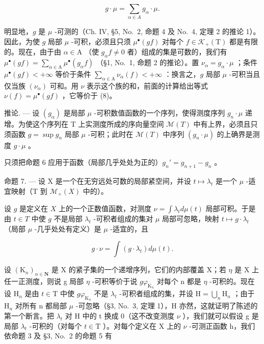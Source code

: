 \[
g \cdot \mu = \sum_ {\alpha \in A} g _ {\alpha} \cdot \mu .\tag{8}
\]

明显地，\(g\) 是 \(\mu\) -可测的（Ch. IV, §5, No.~2, 命题 4 及 No.~4, 定理 2 的推论 1）。因此，为使 \(g\) 局部 \(\mu\) -可积，必须且只须 \(\mu^{\bullet}(gf)\) 对每个 \(f \in \mathcal{K}_{+}(\mathrm{T})\) 都是有限的。现在，由于由 \(\alpha \in \mathrm{A}\) （使 \(g_{\alpha}f \neq 0\) 者）组成的集是可数的，我们有 \(\mu^{\bullet}(gf) = \sum_{\alpha \in \mathrm{A}} \mu^{\bullet}(g_{\alpha}f)\) （§1, No.~1, 命题 2 的推论）。置 \(\nu_{\alpha} = g_{\alpha} \cdot \mu\) ；条件 \(\mu^{\bullet}(gf) < +\infty\) 等价于条件 \(\sum_{\alpha \in \mathrm{A}} \nu_{\alpha}(f) < +\infty\) ：换言之，\(g\) 局部 \(\mu\) -可积当且仅当族 \((\nu_{\alpha})\) 可和。用 \(\nu\) 表示这个族的和，前面的计算给出等式 \(\nu(f) = \mu^{\bullet}(gf)\) ，它等价于 (8)。

推论. --- 设 \((g_{\alpha})\) 是局部 \(\mu\) -可积数值函数的一个序列，使得测度序列 \(g_{n} \cdot \mu\) 递增。为使这个序列在 T 上实测度所成的序向量空间 \(\mathcal{M}(T)\) 中有上界，必须且只须函数 \(g = \sup g_{n}\) 局部 \(\mu\) -可积；此时在 \(\mathcal{M}(T)\) 中序列 \((g_{n} \cdot \mu)\) 的上确界是测度 \(g \cdot \mu\) 。

只须把命题 6 应用于函数（局部几乎处处为正的）\(g_n' = g_{n+1} - g_n\) 。

命题 7. --- 设 X 是一个在无穷远处可数的局部紧空间，并设 \(t \mapsto \lambda_t\) 是一个 \(\mu\) -适宜映射（T 到 \(\mathcal{M}_+(X)\) 中的）。

设 \(g\) 是定义在 \(X\) 上的一个正数值函数，对测度 \(\nu = \int \lambda_t d\mu(t)\) 局部可积。于是由 \(t \in T\) 中使 \(g\) 不是局部 \(\lambda_t\) -可积者组成的集对 \(\mu\) 局部可忽略，映射 \(t \mapsto g \cdot \lambda_t\) （局部 \(\mu\) -几乎处处有定义）是 \(\mu\) -适宜的，且

\[
g \cdot \nu = \int (g \cdot \lambda_ {t}) d \mu (t).\tag{9}
\]

设 \((\mathrm{K}_{n})_{n\in\mathbf{N}}\) 是 X 的紧子集的一个递增序列，它们的内部覆盖 X；若 \(\eta\) 是 X 上任一正测度，则说 g 局部 \(\eta\) -可积等价于说 \(g\varphi_{\mathrm{K}_{n}}\) 对每个 n 都是 \(\eta\) -可积的。现在设 \(\mathrm{H}_{n}\) 是由 \(t\in\mathrm{T}\) 中使 \(g\varphi_{\mathrm{K}_{n}}\) 不是 \(\lambda_{t}\) -可积者组成的集，并设 \(\mathrm{H}=\bigcup_{n}\mathrm{H}_{n}\) ；由于 \(\mathrm{H}_{n}\) 对所有 n 都局部 \(\mu\) -可忽略（§3, No.~3, 定理 1），H 亦然，这就证明了陈述的第一个断言。把 \(\lambda_{t}\) 对 H 中的 t 换成 0（这不改变测度 \(\nu\) ），我们就可以假设 g 是局部 \(\lambda_{t}\) -可积的（对每个 \(t\in\mathrm{T}\) ）。对每个定义在 X 上的 \(\nu\) -可测正函数 h，我们依命题 3 及 §3, No.~2 的命题 5 有


